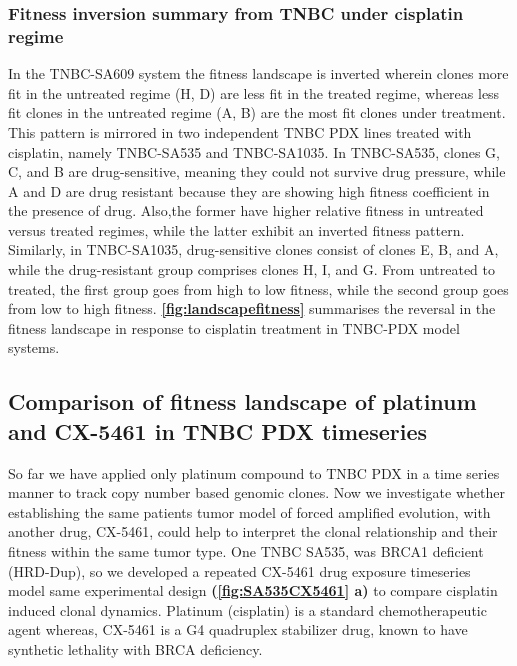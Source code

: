 \subsubsection{Fitness inversion summary from TNBC under cisplatin regime }
In the TNBC-SA609 system the fitness landscape is inverted wherein
clones more fit in the untreated regime (H, D) are less fit in the treated regime, whereas less fit clones in the untreated regime (A, B) are the most fit clones under treatment. This pattern is
mirrored in two independent TNBC PDX lines treated with cisplatin, namely TNBC-SA535 and TNBC-SA1035. In TNBC-SA535, clones G, C, and B are drug-sensitive, meaning they could not survive drug pressure, while A and D are drug resistant because they are showing high fitness coefficient in the presence of drug. Also,the former have higher relative fitness in untreated versus treated regimes, while the latter exhibit an inverted fitness pattern. Similarly, in TNBC-SA1035, drug-sensitive clones consist of clones E, B, and A, while the drug-resistant group comprises clones H, I, and G. From untreated
to treated, the first group goes from high to low fitness, while the second group goes from low to high fitness. \textbf{\autoref{fig:landscapefitness}} summarises the reversal in the fitness landscape in response to cisplatin treatment in TNBC-PDX model systems.



\subsection{Comparison of fitness landscape of platinum and CX-5461 in TNBC PDX timeseries}
So far we have applied only platinum compound to TNBC PDX in a time series manner to track copy number based genomic clones. Now we investigate whether establishing the same patients tumor model of forced amplified evolution, with another drug, CX-5461, could help to interpret the clonal relationship and their fitness within the same tumor type.
One TNBC SA535, was BRCA1 deficient (HRD-Dup), so we developed a repeated CX-5461 drug exposure timeseries model same experimental design \textbf{(\autoref{fig:SA535CX5461} a)} to compare cisplatin induced clonal dynamics. Platinum (cisplatin) is a standard chemotherapeutic agent whereas, CX-5461 is a G4 quadruplex stabilizer drug, known to have synthetic lethality with BRCA deficiency.

